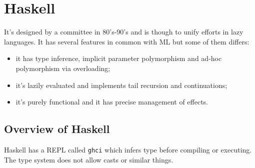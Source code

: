\section{Haskell}
It's designed by a committee in 80's-90's and is though to unify efforts in lazy languages.
It has several features in common with ML but some of them differs:
\begin{itemize}
    \item it has type inference, implicit parameter polymorphism and ad-hoc polymorphism via overloading;
    \item it's lazily evaluated and implements tail recursion and continuations;
    \item it's purely functional and it has precise management of effects.
\end{itemize}

\subsection{Overview of Haskell}
Haskell has a REPL called \verb|ghci| which infers type before compiling or executing.
The type system does not allow casts or similar things.

